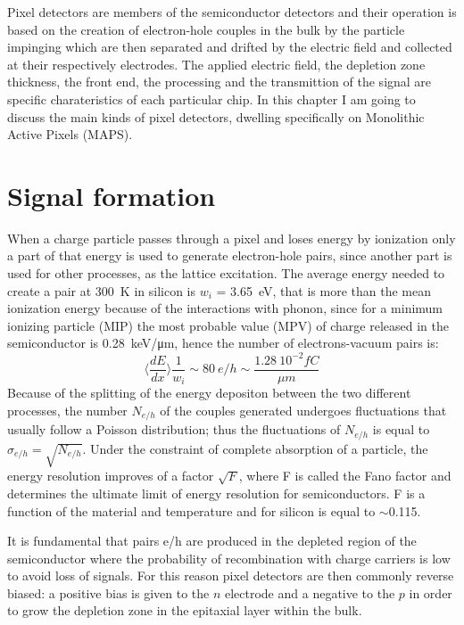 Pixel detectors are members of the semiconductor detectors and their operation is based on the creation of electron-hole couples in the bulk by the particle impinging which are then separated and drifted by the electric field and collected at their respectively electrodes.
The applied electric field, the depletion zone thickness, the front end, the processing and the transmittion of the signal are specific charateristics of each particular chip. In this chapter I am going to discuss the main kinds of pixel detectors, dwelling specifically on Monolithic Active Pixels (MAPS).

\section{Signal formation}
   When a charge particle passes through a pixel and loses energy by ionization only a part of that energy is used to generate electron-hole pairs, since another part is used for other processes, as the lattice excitation.
   The average energy needed to create a pair at \SI{300}{K} in silicon is $w_i$ = \SI{3.65}{eV}, that is more than the mean ionization energy because of the interactions with phonon, since for a minimum ionizing particle (MIP) the most probable value (MPV) of charge released in the semiconductor is \SI{0.28}{keV/\um}, hence the number of electrons-vacuum pairs is: 
   \begin{equation}
       \langle \frac{dE}{dx}\rangle \frac{1}{w_i} \sim 80 \: e/h \sim \frac{1.28 \:10^{-2}fC}{\mu m}
   \end{equation}
   Because of the splitting of the energy depositon between the two different processes, the number $N_{e/h}$ of the couples generated undergoes fluctuations that usually follow a Poisson distribution;
   thus the fluctuations of $N_{e/h}$ is equal to  $\sigma_{e/h} =\sqrt{N_{e/h}}$.
   Under the constraint of complete absorption of a particle, the energy resolution improves of a factor $\sqrt{F}$, where F is called the Fano factor and determines the ultimate limit of energy resolution for semiconductors. F is a function of the material and temperature and for silicon is equal to $\sim$0.115.

   It is fundamental that pairs e/h are produced in the depleted region of the semiconductor where the probability of recombination with charge carriers is low to avoid loss of signals.
   For this reason pixel detectors are then commonly reverse biased: a positive bias is given to the $n$ electrode and a negative to the $p$ in order to grow the depletion zone in the epitaxial layer within the bulk. 

